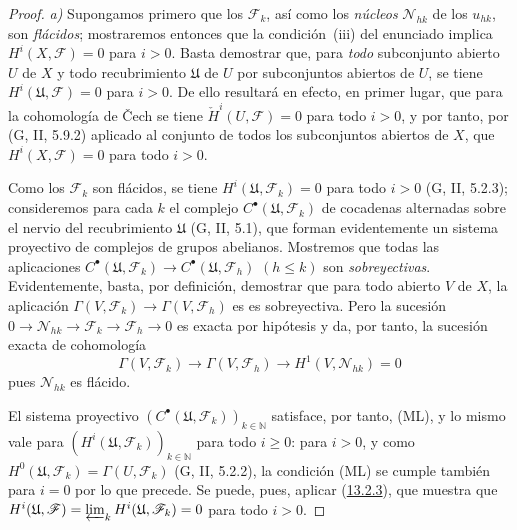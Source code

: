 \begin{proof}
\emph{a)}
Supongamos primero que los $\mathcal F_k$, así como los \emph{núcleos}
$\mathcal N_{hk}$ de los $u_{hk}$, son \emph{flácidos}; mostraremos entonces que
la condición~{\rm(iii)} del enunciado implica
$H^i(X,\mathcal F)=0$ para $i>0$.
Basta demostrar que, para \emph{todo} subconjunto abierto $U$ de $X$ y todo
recubrimiento $\mathfrak U$ de $U$ por subconjuntos abiertos de $U$, se tiene $H^i(\mathfrak U,\mathcal F)=0$ para $i>0$. De ello resultará en efecto, en primer lugar, que para la cohomología de Čech se tiene
$\check H^i(U,\mathcal F)=0$ para todo $i>0$, y por tanto, por
(G, II, 5.9.2) aplicado al conjunto de todos los subconjuntos abiertos de
$X$, que $H^i(X,\mathcal F)=0$ para todo $i>0$.

Como los $\mathcal F_k$ son flácidos, se tiene
$H^i(\mathfrak U,\mathcal F_k)=0$ para todo $i>0$ (G, II, 5.2.3); consideremos para cada $k$ el complejo $C^\bullet(\mathfrak U,\mathcal F_k)$ de cocadenas
alternadas sobre el nervio del recubrimiento $\mathfrak U$ (G, II, 5.1), que forman evidentemente un sistema proyectivo de complejos de grupos abelianos. Mostremos que todas las aplicaciones $C^\bullet(\mathfrak U,\mathcal F_k)\to
C^\bullet(\mathfrak U,\mathcal F_h)$ $(h\leq k)$ son \emph{sobreyectivas}. Evidentemente, basta, por definición, demostrar que para todo abierto $V$
de $X$, la aplicación
$\Gamma(V,\mathcal F_k)\to\Gamma(V,\mathcal F_h)$ es
es sobreyectiva. Pero la sucesión
$0\to\mathcal N_{hk}\to\mathcal F_k\to\mathcal F_h\to0$
es exacta por hipótesis y da, por tanto, la sucesión exacta de
cohomología
\[
\Gamma(V,\mathcal F_k)\longrightarrow\Gamma(V,\mathcal F_h)
\longrightarrow H^1(V,\mathcal N_{hk})=0
\]
pues $\mathcal N_{hk}$ es flácido.

El sistema proyectivo
$(C^\bullet(\mathfrak U,\mathcal F_k))_{k\in\mathbb N}$
satisface, por tanto, (ML), y lo mismo vale para
$(H^i(\mathfrak U,\mathcal F_k))_{k\in\mathbb N}$ para todo $i\geq0$:
para $i>0$, y como $H^0(\mathfrak U,\mathcal F_k)=\Gamma(U,\mathcal F_k)$
(G, II, 5.2.2), la condición (ML) se cumple también para $i=0$ por lo que precede. Se puede, pues, aplicar (\hyperref[0.13.2.3-fr]{13.2.3}), que muestra que $H^i(\mathfrak U,\mathcal F)=\varprojlim_k H^i(\mathfrak U,\mathcal F_k)=0$ para todo $i>0$.


\end{proof}
